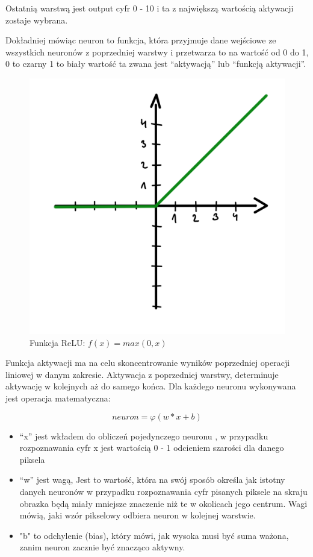 \documentclass[brudnopis]{xmgr}
\begin{document}
Ostatnią warstwą jest output cyfr 0 - 10 i ta z największą wartością aktywacji zostaje wybrana. 

Dokładniej mówiąc neuron to funkcja, która przyjmuje dane wejściowe ze wszystkich neuronów z poprzedniej warstwy i przetwarza to na wartość od 0 do 1, 0 to czarny 1 to biały wartość ta zwana jest “aktywacją” lub “funkcją aktywacji”.

\begin{figure}[!tbh]
\centering
\includegraphics[width=.8\hsize]{fig/4}
\caption{Funkcja ReLU: $f(x) = max(0, x)$\label{RYS.3}}
\end{figure}

Funkcja aktywacji ma na celu skoncentrowanie wyników poprzedniej operacji liniowej w danym zakresie.
Aktywacja z poprzedniej warstwy, determinuje aktywację w kolejnych aż do samego końca. 
Dla każdego neuronu wykonywana jest operacja matematyczna:

\begin{equation}
neuron  = φ (w * x + b)
\end{equation}

\begin{itemize}
\item “x” jest wkładem do obliczeń pojedynczego neuronu , w przypadku rozpoznawania cyfr x jest wartością 0 - 1 odcieniem szarości dla danego piksela
\item “w” jest wagą, Jest to wartość, która na swój sposób określa jak istotny danych neuronów w przypadku rozpoznawania cyfr pisanych piksele na skraju obrazka będą miały mniejsze znaczenie niż te w okolicach jego centrum. Wagi mówią, jaki wzór pikselowy odbiera neuron w kolejnej warstwie.
\item "b" to odchylenie (bias), który mówi, jak wysoka musi być suma ważona, zanim neuron zacznie być znacząco aktywny.
\end{itemize}
\end{document}
